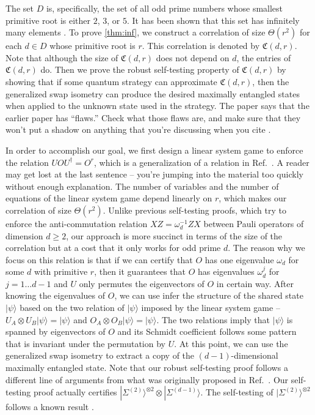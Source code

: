 \documentclass[11pt,letterpaper]{article}
\newcommand{\ket}[1]{|#1\rangle}
\newcommand{\x}{\otimes}
\newcommand{\ct}{^{\dagger}}
\newcommand{\1}{\mathbb{1}}
\newcommand{\EPR}[1]{\Sigma^{(#1)}}
\newcommand{\fC}{\mathfrak{C}}
\def\carl#1{{\color{blue} #1}}
\newtheorem{theorem}{Theorem}[section]
\theoremstyle{definition}
\begin{document}
The set $D$ is, \carl{
specifically, the set of all 
odd prime numbers whose smallest primitive root is either $2$, $3$,
or $5$}.  It has been shown that \carl{this set} has infinitely many elements \cite{murty1988}.
To prove \cref{thm:inf}, we construct a correlation of size $\Theta(r^2)$ for each $d \in D$ whose primitive
root is $r$. This correlation is denoted by $\fC(d,r)$.
Note that although the size of $\fC(d,r)$ does not depend on $d$, the entries of $\fC(d,r)$ do.
Then we prove the robust self-testing property of $\fC(d,r)$ by showing 
that if some quantum strategy can approximate $\fC(d,r)$, then
the generalized swap isometry \cite{yang2013}
can produce the desired maximally entangled states when applied to the unknown state used in the strategy.
\carl{The paper \cite{bamps2015} says that the earlier paper \cite{yang2013} has ``flaws.'' Check what those flaws are, and make sure that they won't put a shadow on anything that you're discussing when you cite \cite{yang2013}.} 

In order to accomplish our goal, we first design a linear system game to enforce the 
relation $UOU\ct = O^r$, which is a generalization of a relation in Ref.~\cite{slofstra2017}.  \carl{A reader may get lost at the last sentence -- you're jumping into the material too quickly without enough explanation.}
The number of variables and the number of equations of the linear system game depend linearly on $r$,
which makes our correlation of size $\Theta(r^2)$.
Unlike previous self-testing proofs, which try to enforce the anti-commutation relation
$XZ = \omega_d^{-1} ZX$ between Pauli operators of dimension $d \geq 2$, 
our approach is more succinct in terms of the size of the correlation but at a cost that
it only works for odd prime $d$.
The reason why we focus on this relation is that if we can certify that $O$ has one eigenvalue $\omega_d$
for some $d$ with primitive $r$,
then it guarantees that $O$ has eigenvalues $\omega_d^j$ for $j = 1 \dots d-1$ and $U$ only
permutes the eigenvectors of $O$ in certain way.
After knowing the eigenvalues of $O$, we can use infer the structure of the shared state $\ket{\psi}$
based on the two relation of $\ket{\psi}$ imposed by the linear system game --
$U_A \x U_B \ket{\psi} = \ket{\psi}$ and $O_A \x O_B \ket{\psi} = \ket{\psi}$.
The two relations imply that $\ket{\psi}$ is spanned by eigenvectors of $O$ and its
Schmidt coefficient follows some pattern that is invariant under the permutation by $U$.
At this point, we can use the generalized swap isometry \cite{yang2013} to extract a copy of the 
$(d-1)$-dimensional maximally entangled state. Note that our robust self-testing proof 
follows a different line of arguments from what was originally
proposed in Ref.~\cite{yang2013}.
Our self-testing proof actually certifies $\ket{\EPR{2}}^{\x 2} \x \ket{\EPR{d-1}}$. 
The self-testing of $\ket{\EPR{2}}^{\x 2}$ follows a known result \cite{wu2016}.
\end{document}
